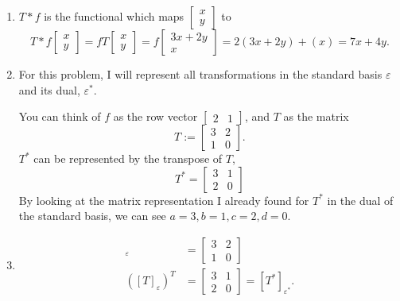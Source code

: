 \documentclass{article}
\begin{document}
\bigskip
\par
\begin{prob}
\end{prob}
\begin{enumerate}[label=(\alph*)]
    \item $T*f$ is the functional which maps $ \begin{bmatrix}
        x \\
        y
    \end{bmatrix}$ to
    \[ T*f \begin{bmatrix}
        x \\
        y
    \end{bmatrix} = fT \begin{bmatrix}
        x \\
        y
    \end{bmatrix} = f \begin{bmatrix}
        3x+2y \\
        x
    \end{bmatrix} = 2(3x+2y)+(x) = 7x+4y. \]
    \item For this problem, I will represent all transformations in the standard basis $\varepsilon$ and its dual, $\varepsilon^*$.
        \par
        You can think of $f$ as the row vector $ \begin{bmatrix}
            2 & 1
    \end{bmatrix}$, and $T$ as the matrix
    \[ T := \begin{bmatrix}
        3 & 2 \\
        1 & 0
    \end{bmatrix}. \]
    $T^*$ can be represented by the transpose of $T$,
    \[ T^* = \begin{bmatrix}
        3 & 1 \\
        2 & 0
    \end{bmatrix} \]
    By looking at the matrix representation I already found for $T^*$ in the dual of the standard basis, we can see $a=3, b=1, c=2, d=0$.
\item \begin{align*}
        [T]_\varepsilon &= \begin{bmatrix}
            3 & 2 \\
            1 & 0
        \end{bmatrix} \\
            ([T]_\varepsilon)^T &= \begin{bmatrix}
            3 & 1 \\
            2 & 0
        \end{bmatrix} = [T^*]_{\varepsilon^*}.
\end{align*}
\end{enumerate}
\end{document}
